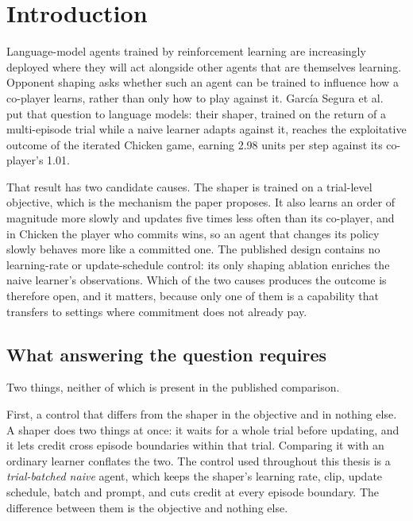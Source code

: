 \chapter{Introduction}
\label{ch:aims}


Language-model agents trained by reinforcement learning are increasingly
deployed where they will act alongside other agents that are themselves
learning.
Opponent shaping asks whether such an agent can be trained to influence how
a co-player learns, rather than only how to play against it.
Garc\'ia Segura et al.\ \cite{garciasegura2025} put that question to
language models: their shaper, trained on the return of a multi-episode
trial while a naive learner adapts against it, reaches the exploitative
outcome of the iterated Chicken game, earning 2.98 units per step against
its co-player's 1.01.

That result has two candidate causes.
The shaper is trained on a trial-level objective, which is the mechanism the
paper proposes.
It also learns an order of magnitude more slowly and updates five times less
often than its co-player, and in Chicken the player who commits wins, so an
agent that changes its policy slowly behaves more like a committed one.
The published design contains no learning-rate or update-schedule control:
its only shaping ablation enriches the naive learner's observations.
Which of the two causes produces the outcome is therefore open, and it
matters, because only one of them is a capability that transfers to settings
where commitment does not already pay.

\section{What answering the question requires}
\label{sec:aims-requires}

Two things, neither of which is present in the published comparison.

First, a control that differs from the shaper in the objective and in
nothing else.
A shaper does two things at once: it waits for a whole trial before
updating, and it lets credit cross episode boundaries within that trial.
Comparing it with an ordinary learner conflates the two.
The control used throughout this thesis is a \emph{trial-batched naive}
agent, which keeps the shaper's learning rate, clip, update schedule, batch
and prompt, and cuts credit at every episode boundary.
The difference between them is the objective and nothing else.

